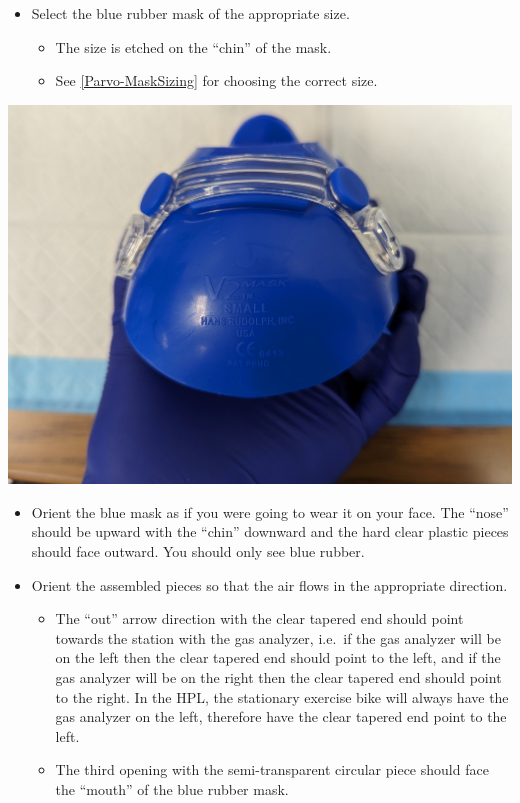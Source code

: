 \documentclass[
]{book}
\providecommand{\tightlist}{%
  \setlength{\itemsep}{0pt}\setlength{\parskip}{0pt}}
\begin{document}
\begin{itemize}
\tightlist
\item
  Select the blue rubber mask of the appropriate size.

  \begin{itemize}
  \tightlist
  \item
    The size is etched on the ``chin'' of the mask.
  \item
    See \ref{Parvo-MaskSizing} for choosing the correct size.
  \end{itemize}
\end{itemize}

\includegraphics[width=1\linewidth]{images/maskassembly/10_show_mask_size}

\begin{itemize}
\tightlist
\item
  Orient the blue mask as if you were going to wear it on your face. The ``nose'' should be upward with the ``chin'' downward and the hard clear plastic pieces should face outward. You should only see blue rubber.
\item
  Orient the assembled pieces so that the air flows in the appropriate direction.

  \begin{itemize}
  \tightlist
  \item
    The ``out'' arrow direction with the clear tapered end should point towards the station with the gas analyzer, i.e.~if the gas analyzer will be on the left then the clear tapered end should point to the left, and if the gas analyzer will be on the right then the clear tapered end should point to the right. In the HPL, the stationary exercise bike will always have the gas analyzer on the left, therefore have the clear tapered end point to the left.
  \item
    The third opening with the semi-transparent circular piece should face the ``mouth'' of the blue rubber mask.
  \end{itemize}
\end{itemize}
\end{document}
